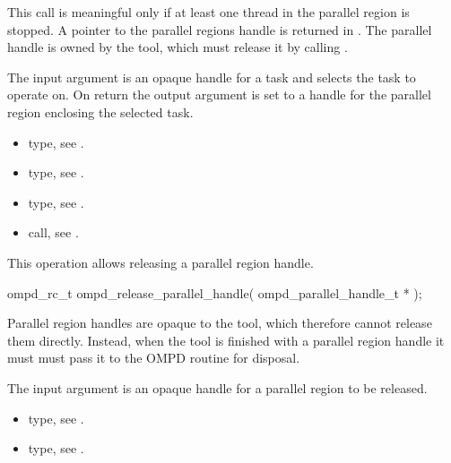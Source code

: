 \descr
This call is meaningful only if at least one thread in the parallel region is stopped.
A pointer to the parallel regions handle is returned in .
The parallel handle is owned by the
tool, which must release it by calling .

\argdesc
The input argument  is an opaque handle for a task and selects the task to operate on.
On return the output argument  is set to a handle for the parallel region
enclosing the selected task.

\crossreferences
\begin{itemize}
  \item {} type, see .
	\item {} type, see .
	\item {} type, see .
	\item {} call, see .
\end{itemize}

\label{subsubsubsec:ompd_release_parallel_handle}
\summary
This operation allows releasing a parallel region handle.

\format

\begin{cspecific}
\begin{ompSyntax}
ompd_rc_t ompd_release_parallel_handle(
  ompd_parallel_handle_t *
);
\end{ompSyntax}
\end{cspecific}


\descr
Parallel region handles are opaque to the tool, which therefore
cannot release them directly. Instead, when the tool is finished with a parallel region handle
it must must pass it to the OMPD 
routine for disposal.

\argdesc
The input argument  is an opaque handle for a parallel region
to be released.

\crossreferences
\begin{itemize}
  \item {} type, see .
	\item {} type, see .
\end{itemize}

